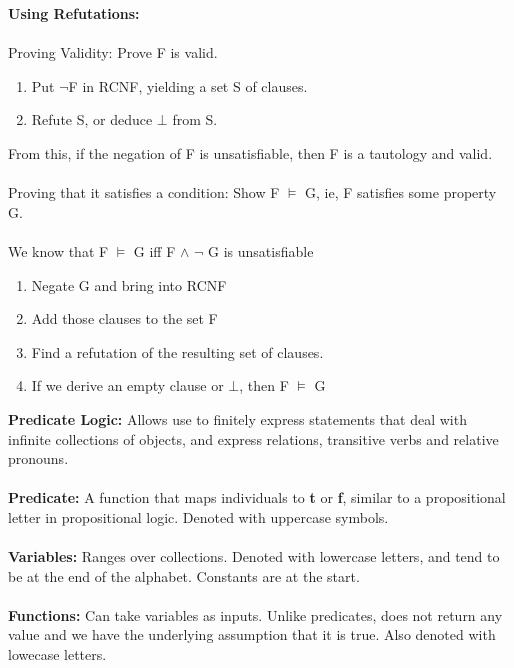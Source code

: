 \documentclass[a4paper,10pt]{article}
\begin{document}
\noindent \textcolor{RoyalPurple}{\textbf{Using Refutations:}} \\ \\
\indent \textcolor{RoyalPurple}{Proving Validity:} Prove F is valid.
\begin{enumerate}
	\item Put $\neg$F in RCNF, yielding a set S of clauses. 
	\item Refute S, or deduce $\bot$ from S. 
\end{enumerate}
\indent \indent From this, if the negation of F is unsatisfiable, then F is a tautology and valid. \\ \\

\indent \textcolor{RoyalPurple}{Proving that it satisfies a condition:} Show F $\models$ G, ie, F satisfies some property G. \\ \\
\indent We know that F $\models$ G iff F $\land$ $\neg$ G is unsatisfiable
\begin{enumerate}
	\item Negate G and bring into RCNF 
	\item Add those clauses to the set F
	\item Find a refutation of the resulting set of clauses. 
	\item If we derive an empty clause or $\bot$, then F $\models$ G
\end{enumerate}
\newpage 
\noindent \textcolor{RoyalPurple}{\textbf{Predicate Logic:}} Allows use to finitely express statements that deal with infinite collections of objects, and express relations, transitive verbs and relative pronouns. \\ \\
\noindent \textcolor{RoyalPurple}{\textbf{Predicate:}} A function that maps individuals to \textbf{t} or \textbf{f}, similar to a propositional letter in propositional logic. Denoted with uppercase symbols.\\ \\
\noindent \textcolor{RoyalPurple}{\textbf{Variables:}} Ranges over collections. Denoted with lowercase letters, and tend to be at the end of the alphabet. Constants are at the start. \\ \\
\noindent \textcolor{RoyalPurple}{\textbf{Functions:}} Can take variables as inputs. Unlike predicates, does not return any value and we have the underlying assumption that it is true. Also denoted with lowecase letters.\\ \\
\end{document}
